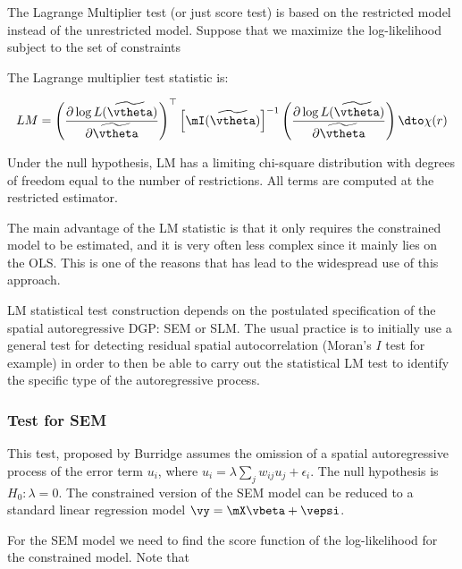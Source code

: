 \documentclass[english,12pt]{book}\usepackage[]{graphicx}\usepackage[]{xcolor}
\begin{document}
The Lagrange Multiplier test (or just score test) is based on the restricted model instead of the unrestricted model. Suppose that we maximize the log-likelihood subject to the set of constraints

\begin{theorem}
  The Lagrange multiplier test statistic is:
  
  
  \begin{equation}
    LM = \left(\frac{\partial \log L(\widetilde{\vtheta})}{\partial \widetilde{\vtheta}}\right)^\top\left[\mI(\widetilde{\vtheta})\right]^{-1}\left(\frac{\partial \log L(\widetilde{\vtheta})}{\partial \widetilde{\vtheta}}\right) \dto \chi(r)
  \end{equation}
  
  Under the null hypothesis, LM has a limiting chi-square distribution with degrees of freedom equal to the number of restrictions. All terms are computed at the restricted estimator. 
\end{theorem}


The main advantage of the LM statistic is that it only requires the constrained model to be estimated, and it is very often less complex since it mainly lies on the OLS. This is one of the reasons that has lead to the widespread use of this approach.

LM statistical test construction depends on the postulated specification of the spatial autoregressive DGP: SEM or SLM. The usual practice is to initially use a general test for detecting residual spatial autocorrelation (Moran's $I$ test for example) in order to then be able to carry out the statistical LM test to identify the specific type of the autoregressive process. 

\subsubsection{Test for SEM}

This test, proposed by Burridge assumes the omission of a spatial autoregressive process of the error term $u_i$, where $u_i = \lambda\sum_{j}w_{ij}u_j + \epsilon_i$. The null hypothesis is $H_0: \lambda = 0$. The constrained version of the SEM model can be reduced to a standard linear regression model $\vy = \mX\vbeta + \vepsi$.

For the SEM model we need to find the score function of the log-likelihood for the constrained model. Note that
\end{document}
